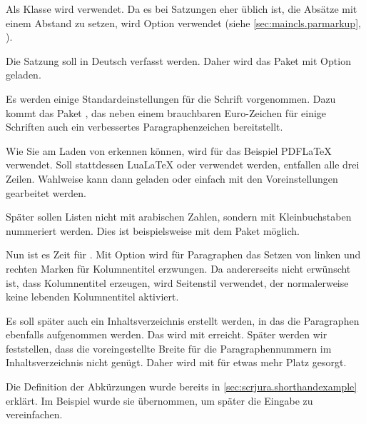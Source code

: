 %
Als Klasse wird  verwendet. Da es bei Satzungen eher üblich
ist, die Absätze mit einem Abstand zu setzen, wird Option
 verwendet (siehe
\autoref{sec:maincls.parmarkup}, ).

%
Die Satzung soll in Deutsch verfasst werden. Daher wird das Paket
 mit Option  geladen.

%
Es werden einige Standardeinstellungen für die Schrift vorgenommen. Dazu kommt
das Paket , das neben einem brauchbaren Euro-Zeichen für
einige Schriften auch ein verbessertes Paragraphenzeichen bereitstellt.

Wie Sie am Laden von  erkennen können, wird für das Beispiel
PDF\LaTeX{} verwendet. Soll stattdessen Lua\LaTeX{} oder \XeLaTeX{} verwendet
werden, entfallen alle drei Zeilen. Wahlweise kann dann 
geladen oder einfach mit den Voreinstellungen gearbeitet werden.

%
Später sollen Listen nicht mit arabischen Zahlen, sondern mit Kleinbuchstaben
nummeriert werden. Dies ist beispielsweise mit dem Paket 
möglich.

%
Nun ist es Zeit für . Mit Option
 wird für Paragraphen das
Setzen von linken und rechten Marken für Kolumnentitel erzwungen. Da
andererseits nicht erwünscht ist, dass 
Kolumnentitel erzeugen, wird Seitenstil  verwendet, der
normalerweise keine lebenden Kolumnentitel aktiviert.

Es soll später auch ein Inhaltsverzeichnis erstellt werden, in das die
Paragraphen ebenfalls aufgenommen werden. Das wird mit
 erreicht. Später werden wir feststellen,
dass die voreingestellte Breite für die Paragraphennummern im
Inhaltsverzeichnis nicht genügt. Daher wird mit
 für etwas mehr Platz
gesorgt.

Die Definition der Abkürzungen wurde bereits in
\autoref{sec:scrjura.shorthandexample} erklärt. Im Beispiel wurde sie
übernommen, um später die Eingabe zu vereinfachen.


